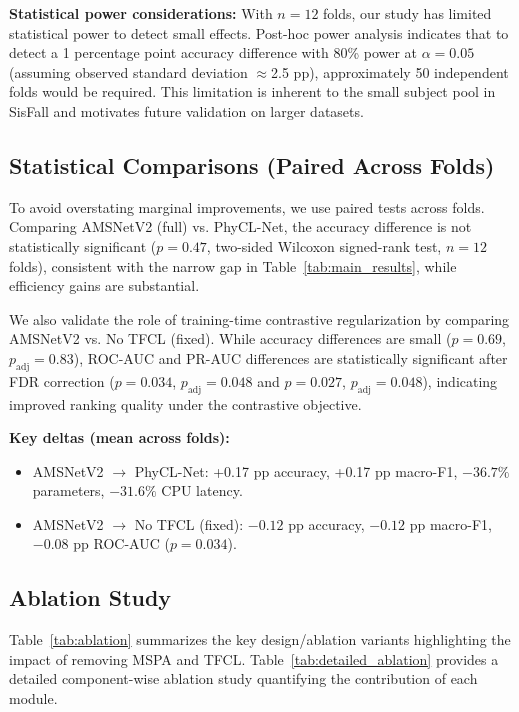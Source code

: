 \documentclass{article}
\begin{document}
\textbf{Statistical power considerations:} With $n=12$ folds, our study has limited statistical power to detect small effects. Post-hoc power analysis indicates that to detect a 1 percentage point accuracy difference with 80\% power at $\alpha=0.05$ (assuming observed standard deviation $\approx$2.5 pp), approximately 50 independent folds would be required. This limitation is inherent to the small subject pool in SisFall and motivates future validation on larger datasets.

\subsection{Statistical Comparisons (Paired Across Folds)}

To avoid overstating marginal improvements, we use paired tests across folds. Comparing AMSNetV2 (full) vs. PhyCL-Net, the accuracy difference is not statistically significant ($p=0.47$, two-sided Wilcoxon signed-rank test, $n=12$ folds), consistent with the narrow gap in Table~\ref{tab:main_results}, while efficiency gains are substantial.

We also validate the role of training-time contrastive regularization by comparing AMSNetV2 vs. No TFCL (fixed). While accuracy differences are small ($p=0.69$, $p_{\mathrm{adj}}=0.83$), ROC-AUC and PR-AUC differences are statistically significant after FDR correction ($p=0.034$, $p_{\mathrm{adj}}=0.048$ and $p=0.027$, $p_{\mathrm{adj}}=0.048$), indicating improved ranking quality under the contrastive objective.

\textbf{Key deltas (mean across folds):}
\begin{itemize}
    \item AMSNetV2 $\to$ PhyCL-Net: +0.17 pp accuracy, +0.17 pp macro-F1, $-36.7\%$ parameters, $-31.6\%$ CPU latency.
    \item AMSNetV2 $\to$ No TFCL (fixed): $-0.12$ pp accuracy, $-0.12$ pp macro-F1, $-0.08$ pp ROC-AUC ($p=0.034$).
\end{itemize}

\subsection{Ablation Study}

Table~\ref{tab:ablation} summarizes the key design/ablation variants highlighting the impact of removing MSPA and TFCL. Table~\ref{tab:detailed_ablation} provides a detailed component-wise ablation study quantifying the contribution of each module.
\end{document}

